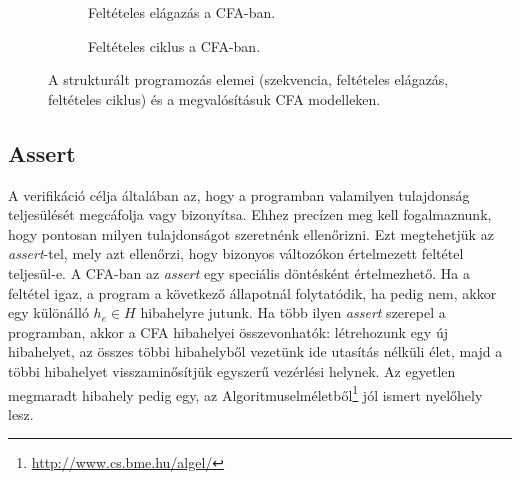 \begin{figure}[!htb]
\begin{subfigure}[b]{.3\linewidth}
		\caption{Feltételes elágazás a CFA-ban.}
		\label{fig:structprogselcfa}
	\end{subfigure}
	\hfill
	\begin{subfigure}[b]{.3\linewidth}
		\centering
		\caption{Feltételes ciklus a CFA-ban.}
		\label{fig:structprogrepcfa}
	\end{subfigure}
	\caption{A strukturált programozás elemei (szekvencia, feltételes elágazás, feltételes ciklus) és a megvalósításuk CFA modelleken.}
	\label{fig:structprog}
\end{figure}

\subsection{Assert}
A verifikáció célja általában az, hogy a programban valamilyen tulajdonság teljesülését megcáfolja vagy bizonyítsa. Ehhez precízen meg kell fogalmaznunk, hogy pontosan milyen tulajdonságot szeretnénk ellenőrizni. Ezt megtehetjük az \emph{assert}-tel, mely azt ellenőrzi, hogy bizonyos változókon értelmezett feltétel teljesül-e. 
\newline
\newline
A CFA-ban az \emph{assert} egy speciális döntésként értelmezhető. Ha a feltétel igaz, a program a következő állapotnál folytatódik, ha pedig nem, akkor egy különálló $h_e \in H$ hibahelyre jutunk. Ha több ilyen \emph{assert} szerepel a programban, akkor a CFA hibahelyei összevonhatók: létrehozunk egy új hibahelyet, az összes többi hibahelyből vezetünk ide utasítás nélküli élet, majd a többi hibahelyet visszaminősítjük egyszerű vezérlési helynek. Az egyetlen megmaradt hibahely pedig egy, az Algoritmuselméletből\footnote{\url{http://www.cs.bme.hu/algel/}} jól ismert nyelőhely lesz. 

